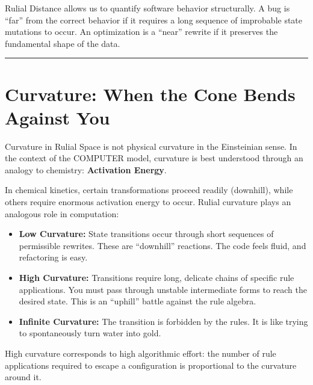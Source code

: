 Rulial Distance allows us to quantify software behavior structurally. A bug is ``far'' from the correct behavior if it requires a long sequence of improbable state mutations to occur. An optimization is a ``near'' rewrite if it preserves the fundamental shape of the data.

\begin{center}
\rule{0.5\linewidth}{0.5pt}
\end{center}

\section{Curvature: When the Cone Bends Against You}
\label{curvature-when-the-cone-bends-against-you}

Curvature in Rulial Space is not physical curvature in the Einsteinian sense. In the context of the COMPUTER model, curvature is best understood through an analogy to chemistry: \textbf{Activation Energy}.

In chemical kinetics, certain transformations proceed readily (downhill), while others require enormous activation energy to occur. Rulial curvature plays an analogous role in computation:

\begin{itemize}
    \item \textbf{Low Curvature:} State transitions occur through short sequences of permissible rewrites. These are ``downhill'' reactions. The code feels fluid, and refactoring is easy.
    \item \textbf{High Curvature:} Transitions require long, delicate chains of specific rule applications. You must pass through unstable intermediate forms to reach the desired state. This is an ``uphill'' battle against the rule algebra.
    \item \textbf{Infinite Curvature:} The transition is forbidden by the rules. It is like trying to spontaneously turn water into gold.
\end{itemize}

High curvature corresponds to high algorithmic effort: the number of rule applications required to escape a configuration is proportional to the curvature around it.

